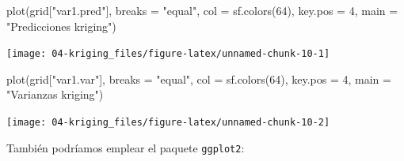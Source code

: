 \documentclass[
  spanish,
]{book}
\newenvironment{Shaded}{\begin{snugshade}}{\end{snugshade}}
\newcommand{\AttributeTok}[1]{\textcolor[rgb]{0.77,0.63,0.00}{#1}}
\newcommand{\DecValTok}[1]{\textcolor[rgb]{0.00,0.00,0.81}{#1}}
\newcommand{\FunctionTok}[1]{\textcolor[rgb]{0.00,0.00,0.00}{#1}}
\newcommand{\NormalTok}[1]{#1}
\newcommand{\StringTok}[1]{\textcolor[rgb]{0.31,0.60,0.02}{#1}}
\theoremstyle{break}
\theoremstyle{definition}
\theoremstyle{definition}
\theoremstyle{definition}
\theoremstyle{definition}
\theoremstyle{remark}
\begin{document}
\begin{Shaded}
\begin{Highlighting}[]
\FunctionTok{plot}\NormalTok{(grid[}\StringTok{"var1.pred"}\NormalTok{], }\AttributeTok{breaks =} \StringTok{"equal"}\NormalTok{, }\AttributeTok{col =} \FunctionTok{sf.colors}\NormalTok{(}\DecValTok{64}\NormalTok{), }\AttributeTok{key.pos =} \DecValTok{4}\NormalTok{,}
     \AttributeTok{main =} \StringTok{"Predicciones kriging"}\NormalTok{)}
\end{Highlighting}
\end{Shaded}

\begin{center}\texttt{[image: 04-kriging\_files/figure-latex/unnamed-chunk-10-1]} \end{center}

\begin{Shaded}
\begin{Highlighting}[]
\FunctionTok{plot}\NormalTok{(grid[}\StringTok{"var1.var"}\NormalTok{], }\AttributeTok{breaks =} \StringTok{"equal"}\NormalTok{, }\AttributeTok{col =} \FunctionTok{sf.colors}\NormalTok{(}\DecValTok{64}\NormalTok{), }\AttributeTok{key.pos =} \DecValTok{4}\NormalTok{,}
     \AttributeTok{main =} \StringTok{"Varianzas kriging"}\NormalTok{)}
\end{Highlighting}
\end{Shaded}

\begin{center}\texttt{[image: 04-kriging\_files/figure-latex/unnamed-chunk-10-2]} \end{center}

También podríamos emplear el paquete \texttt{ggplot2}:
\end{document}
